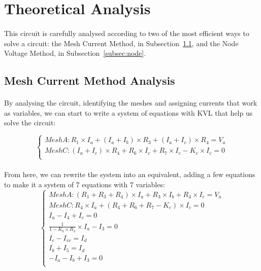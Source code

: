 \section{Theoretical Analysis}
\label{sec:analysis}

\paragraph{}
 This circuit is carefully analysed according to two of the most efficient ways to solve a circuit: the Mesh Current Method, in Subsection~\ref{subsec:mesh}, and the Node Voltage Method, in Subsection~\ref{subsec:node}.

\subsection{Mesh Current Method Analysis}
\label{subsec:mesh}

\paragraph{}
By analysing the circuit, identifying the meshes and assigning currents that work as variables, we can start to write a system of equations with KVL that help us solve the circuit:

\[
\left\{\begin{matrix}
Mesh A: R_1 \times I_a+(I_a+I_b) \times R_3+(I_a+I_c) \times R_4 =V_a\\
Mesh C:	(I_a+I_c) \times R_4+R_6 \times I_c+R_7 \times I_c-K_c \times I_c =0\\
\end{matrix}\right.
\]

\paragraph{}
From here, we can rewrite the system into an equivalent, adding a few equations to make it a system of 7 equations with 7 variables:
\[
\left\{\begin{matrix}
Mesh A: (R_1+R_3+R_4) \times I_a+R_3 \times I_b+R_4 \times I_c=V_a\\
Mesh C: R_4 \times I_a+(R_4+R_6+R_7-K_c) \times I_c=0\\
I_a-I_4+I_c=0\\
\frac{1}{1-K_b \times R_3} \times I_a-I_3=0\\
I_c-I_{vc}=I_d\\
I_b+I_5=I_d\\
-I_a-I_b+I_3=0\\
\end{matrix}\right.
\]

